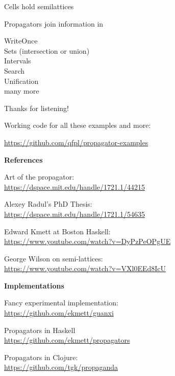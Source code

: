 \documentclass[UKenglish,usenames,dvipsnames,svgnames,table,aspectratio=169,mathserif]{beamer}
\newcommand{\nl}{\vspace{\baselineskip}}
\begin{document}
\begin{frame}
\LARGE \centering

Cells hold semilattices

Propagators join information in
\end{frame}


\begin{frame}

\centering
WriteOnce \\
Sets (intersection or union) \\
Intervals \\
Search \\
Unification \\
many more
\end{frame}


\begin{frame}
\huge \centering
Thanks for listening!
\nl

\large
Working code for all these examples and more:

\url{https://github.com/qfpl/propagator-examples}

\end{frame}

\begin{frame}

{\Large \bf
References}

Art of the propagator: \\
\url{https://dspace.mit.edu/handle/1721.1/44215}

Alexey Radul's PhD Thesis: \\
\url{https://dspace.mit.edu/handle/1721.1/54635}

Edward Kmett at Boston Haskell: \\
\url{https://www.youtube.com/watch?v=DyPzPeOPgUE}

George Wilson on semi-lattices: \\
\url{https://www.youtube.com/watch?v=VXl0EEd8IcU}

\nl
{\Large \bf
Implementations}

Fancy experimental implementation: \\
\url{https://github.com/ekmett/guanxi}

Propagators in Haskell \\
\url{https://github.com/ekmett/propagators}

Propagators in Clojure: \\
\url{https://github.com/tgk/propaganda}

\end{frame}
\end{document}
